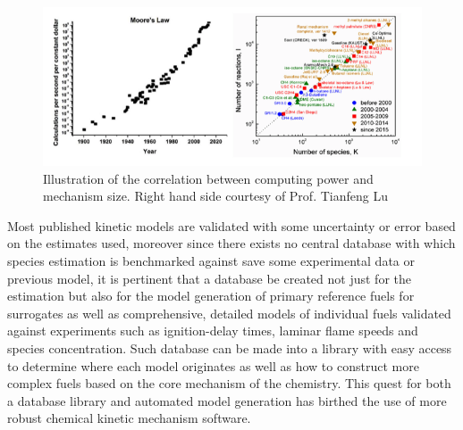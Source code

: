  \begin{figure}[hbp]
 \hspace*{-2cm}
     \centering
     \includegraphics[scale=0.75,keepaspectratio]{images/model_history.png}
     \caption{Illustration of the correlation between computing power and mechanism size. Right hand side courtesy of Prof. Tianfeng Lu \cite{Curran2019DevelopingCombustion}}
     \label{fig:model_history}
 \end{figure}
 
 
 Most published kinetic models are validated with some uncertainty or error based on the estimates used, moreover since there exists no central database with which species estimation is benchmarked against save some experimental data or previous model, it is pertinent that a database be created not just for the estimation but also for the model generation of primary reference fuels for surrogates as well as comprehensive, detailed models of individual fuels validated against experiments such as ignition-delay times, laminar flame speeds and species concentration. Such database can be made into a library with easy access to determine where each model originates as well as how to construct more complex fuels based on the core mechanism of the  chemistry. This quest for both a database library and automated model generation has birthed the use of more robust chemical kinetic mechanism software. 
 
